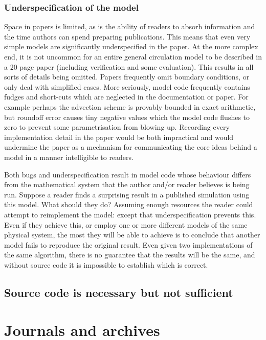 \documentclass[a4paper,11pt]{article}
\begin{document}
\subsubsection{Underspecification of the model}

Space in papers is limited, as is the ability of readers to absorb
information and the time authors can spend preparing publications. This
means that even very simple models are significantly underspecified in the
paper. At the more complex end, it is not uncommon for an entire general
circulation model to be described in a 20 page paper (including verification
and some evaluation). This results in all sorts of details being
omitted. Papers frequently omit boundary conditions, or only deal with
simplified cases. More seriously, model code frequently contains fudges and
short-cuts which are neglected in the documentation or paper. For example
perhaps the advection scheme is provably bounded in exact arithmetic, but
roundoff error causes tiny negative values which the model code flushes to
zero to prevent some parametrisation from blowing up. Recording every
implementation detail in the paper would be both impractical and would
undermine the paper as a mechanism for communicating the core ideas behind a
model in a manner intelligible to readers. 

Both bugs and underspecification result in model code whose behaviour
differs from the mathematical system that the author and/or reader believes
is being run. Suppose a reader finds a surprising result in a published
simulation using this model. What should they do? Assuming enough resources
the reader could attempt to reimplement the model: except that
underspecification prevents this. Even if they achieve this, or employ
one or more different models of the same physical system, the most they will
be able to achieve is to conclude that another model fails to reproduce the
original result. Even given two implementations of the same algorithm, there
is no guarantee that the results will be the same, and without source code
it is impossible to establish which is correct.

\subsection{Source code is necessary but not sufficient}




\section{Journals and archives}
\end{document}
